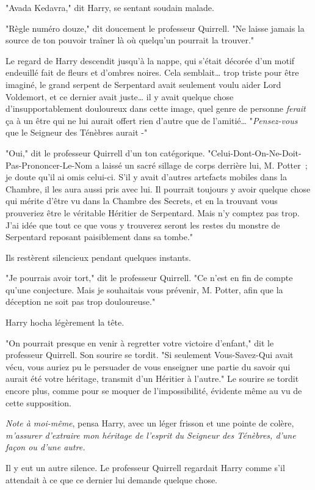 "Avada Kedavra," dit Harry, se sentant soudain malade.

"Règle numéro douze," dit doucement le professeur Quirrell. "Ne laisse jamais la source de ton pouvoir traîner là où quelqu'un pourrait la trouver."

Le regard de Harry descendit jusqu'à la nappe, qui s'était décorée d'un motif endeuillé fait de fleurs et d'ombres noires. Cela semblait… trop triste pour être imaginé, le grand serpent de Serpentard avait seulement voulu aider Lord Voldemort, et ce dernier avait juste… il y avait quelque chose d'insupportablement douloureux dans cette image, quel genre de personne \emph{ferait} ça à un être qui ne lui aurait offert rien d'autre que de l'amitié… "\emph{Pensez-vous} que le Seigneur des Ténèbres aurait -"

"Oui," dit le professeur Quirrell d'un ton catégorique. "Celui-Dont-On-Ne-Doit-Pas-Prononcer-Le-Nom a laissé un sacré sillage de corps derrière lui, M. Potter~; je doute qu'il ai omis celui-ci. S'il y avait d'autres artefacts mobiles dans la Chambre, il les aura aussi pris avec lui. Il pourrait toujours y avoir quelque chose qui mérite d'être vu dans la Chambre des Secrets, et en la trouvant vous prouveriez être le véritable Héritier de Serpentard. Mais n'y comptez pas trop. J'ai idée que tout ce que vous y trouverez seront les restes du monstre de Serpentard reposant paisiblement dans sa tombe."

Ils restèrent silencieux pendant quelques instants.

"Je pourrais avoir tort," dit le professeur Quirrell. "Ce n'est en fin de compte qu'une conjecture. Mais je souhaitais vous prévenir, M. Potter, afin que la déception ne soit pas trop douloureuse."

Harry hocha légèrement la tête.

"On pourrait presque en venir à regretter votre victoire d'enfant," dit le professeur Quirrell. Son sourire se tordit. "Si seulement Vous-Savez-Qui avait vécu, vous auriez pu le persuader de vous enseigner une partie du savoir qui aurait été votre héritage, transmit d'un Héritier à l'autre." Le sourire se tordit encore plus, comme pour se moquer de l'impossibilité, évidente même au vu de cette supposition.

\emph{Note à moi-même}, pensa Harry, avec un léger frisson et une pointe de colère, \emph{m'assurer d'extraire mon héritage de l'esprit du Seigneur des Ténèbres, d'une façon ou d'une autre.}

Il y eut un autre silence. Le professeur Quirrell regardait Harry comme s'il attendait à ce que ce dernier lui demande quelque chose.

